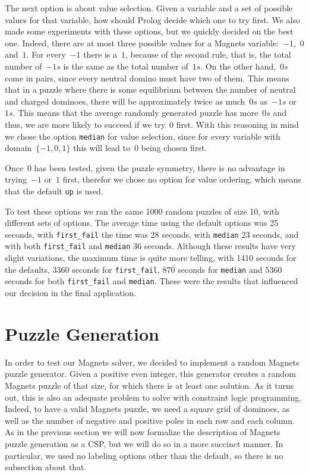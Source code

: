 \documentclass{llncs}
\begin{document}
The next option is about value selection. Given a variable and a set of possible values for that variable, how should Prolog decide which one to try first. We also made some experiments with these options, but we quickly decided on the best one. Indeed, there are at most three possible values for a Magnets variable:~$-1$,~$0$ and~$1$. For every~$-1$ there is a~$1$, because of the second rule, that is, the total number of~$-1s$ is the same as the total number of~$1s$. On the other hand,~$0s$ come in pairs, since every neutral domino must have two of them. This means that in a puzzle where there is some equilibrium between the number of neutral and charged dominoes, there will be approximately twice as much~$0s$ as~$-1s$ or~$1s$. This means that the average randomly generated puzzle has more~$0s$ and thus, we are more likely to succeed if we try~$0$ first. With this reasoning in mind we chose the option \verb|median| for value selection, since for every variable with domain~$\{-1, 0, 1\}$ this will lead to~$0$ being chosen first.

Once~$0$ has been tested, given the puzzle symmetry, there is no advantage in trying~$-1$ or~$1$ first, therefor we chose no option for value ordering, which means that the default \verb|up| is used.

To test these options we ran the same 1000 random puzzles of size 10, with different sets of options. The average time using the default options was 25 seconds, with \verb|first_fail| the time was 28 seconds, with \verb|median| 23 seconds, and with both \verb|first_fail| and \verb|median| 36 seconds. Although these results have very slight variations, the maximum time is quite more telling, with 1410 seconds for the defaults, 3360 seconds for \verb|first_fail|, 870 seconds for \verb|median| and 5360 seconds for both \verb|first_fail| and \verb|median|. These were the results that influenced our decision in the final application.


\section{Puzzle Generation}

In order to test our Magnets solver, we decided to implement a random Magnets puzzle generator. Given a positive even integer, this generator creates a random Magnets puzzle of that size, for which there is at least one solution. As it turns out, this is also an adequate problem to solve with constraint logic programming. Indeed, to have a valid Magnets puzzle, we need a square grid of dominoes, as well as the number of negative and positive poles in each row and each column. As in the previous section we will now formalize the description of Magnets puzzle generation as a CSP, but we will do so in a more succinct manner. In particular, we used no labeling options other than the default, so there is no subsection about that.
\end{document}
